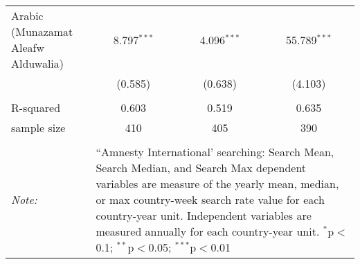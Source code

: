 \begin{table}[!htbp]
\begin{tabular}{@{\extracolsep{5pt}}lccc}
  Arabic (Munazamat Aleafw Alduwalia) & 8.797$^{***}$ & 4.096$^{***}$ & 55.789$^{***}$ \\ 
  & (0.585) & (0.638) & (4.103) \\ 
 \hline \\[-1.8ex] 
R-squared  & 0.603 & 0.519 & 0.635 \\ 
sample size  & 410 & 405 & 390 \\ 
\hline 
\hline \\[-1.8ex] 
\textit{Note:}  & \multicolumn{3}{l}{\parbox[t]{8cm}{``Amnesty International' searching: Search Mean, Search Median, and Search Max dependent variables are measure of the yearly mean, median, or max country-week search rate value for each country-year unit. Independent variables are measured annually for each country-year unit. $^{*}$p$<$0.1; $^{**}$p$<$0.05; $^{***}$p$<$0.01}} \\ 
\end{tabular} 
\end{table} 

